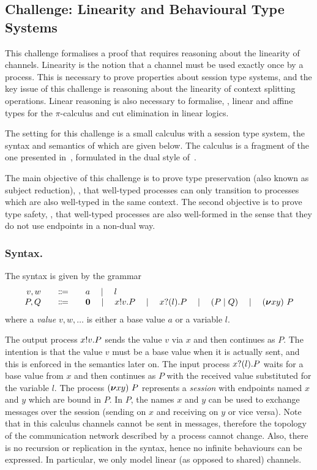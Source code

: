 \subsection{Challenge: Linearity and Behavioural Type Systems}
\label{sec:challenge:linearity-beh-types}
This challenge formalises a proof that requires reasoning about the linearity of channels.
Linearity is the notion that a channel must be used exactly once by a process.
This is necessary to prove properties about session type systems, and the key
issue of this challenge is reasoning about the linearity of context splitting operations.
Linear reasoning is also necessary to formalise, \eg, linear and affine types for the \(\pi\)-calculus and cut elimination in linear logics.

The setting for this challenge is a small calculus with a session type
system, the syntax and semantics of which are given below. The
calculus is a fragment of the one presented in~\cite{Vasconcelos2012},
formulated in the dual style of~\cite{barber96tr}.

The main objective of this challenge is to prove type preservation (also
known as subject reduction), \ie, that well-typed
processes can only transition to processes which are also well-typed
in the same context.
The second objective is to prove type safety, \ie, that well-typed processes are also well-formed in the sense that they do not use endpoints in a non-dual way.

\subsubsection{Syntax.}
The syntax is given by the grammar
\[
\begin{array}{r@{\qquad}c@{\qquad}l}
  v,w & \Coloneqq & a \quad\mid\quad l \\
   P,Q & \Coloneqq & \Pend \quad\mid\quad \Pout{x}{v}{P} \quad\mid\quad \Pin{x}{l}{P} \quad\mid\quad \PBpar{P}{Q} \quad\mid\quad  \Presd{x}{y}{P}
\end{array}
\]
where a \emph{value} \( v, w, \dots \) is either a base value \( a \) or a variable \( l \).

The output process \( x ! v . P \) sends the value \( v \) via \( x \) and then continues as \( P \).
The intention is that the value \( v \) must be a base value when it is actually sent, and this is enforced in the semantics later on.
The input process \( x ? (l) . P \) waits for a base value from \( x \) and then continues as \( P \) with the received value substituted for the variable \( l \).
The process \( (\bm{\nu} xy)~P \) represents a \emph{session} with endpoints named \( x \) and \( y \) which are bound in \( P \). In \( P \), the names \( x \) and \( y \) can be used to exchange messages over the session (sending on \( x \) and receiving on \( y \) or vice versa).
Note that in this calculus channels cannot be sent in messages, therefore the topology of the communication network described by a process cannot change.
Also, there is no recursion or replication in the syntax, hence no infinite behaviours can be expressed. In particular, we only model linear (as opposed to shared) channels.

